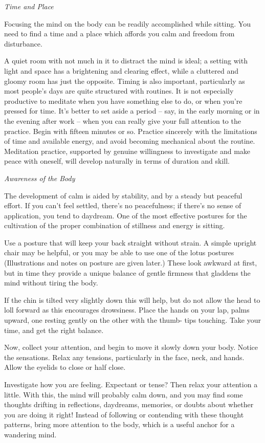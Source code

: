 \emph{Time and Place}

Focusing the mind on the body can be readily accomplished while sitting.
You need to find a time and a place which affords you calm and freedom
from disturbance.

A quiet room with not much in it to distract the mind is ideal; a
setting with light and space has a brightening and clearing effect,
while a cluttered and gloomy room has just the opposite. Timing is also
important, particularly as most people's days are quite structured with
routines. It is not especially productive to meditate when you have
something else to do, or when you're pressed for time. It's better to
set aside a period -- say, in the early morning or in the evening after
work -- when you can really give your full attention to the practice.
Begin with fifteen minutes or so. Practice sincerely with the
limitations of time and available energy, and avoid becoming mechanical
about the routine. Meditation practice, supported by genuine willingness
to investigate and make peace with oneself, will develop naturally in
terms of duration and skill.

\emph{Awareness of the Body}

The development of calm is aided by stability, and by a steady but
peaceful effort. If you can't feel settled, there's no peacefulness; if
there's no sense of application, you tend to daydream. One of the most
effective postures for the cultivation of the proper combination of
stillness and energy is sitting.

Use a posture that will keep your back straight without strain. A simple
upright chair may be helpful, or you may be able to use one of the lotus
postures (Illustrations and notes on posture are given later.) These
look awkward at first, but in time they provide a unique balance of
gentle firmness that gladdens the mind without tiring the body.

If the chin is tilted very slightly down this will help, but do not
allow the head to loll forward as this encourages drowsiness. Place the
hands on your lap, palms upward, one resting gently on the other with
the thumb- tips touching. Take your time, and get the right balance.

Now, collect your attention, and begin to move it slowly down your body.
Notice the sensations. Relax any tensions, particularly in the face,
neck, and hands. Allow the eyelids to close or half close.

Investigate how you are feeling. Expectant or tense? Then relax your
attention a little. With this, the mind will probably calm down, and you
may find some thoughts drifting in reflections, daydreams, memories, or
doubts about whether you are doing it right! Instead of following or
contending with these thought patterns, bring more attention to the
body, which is a useful anchor for a wandering mind.

